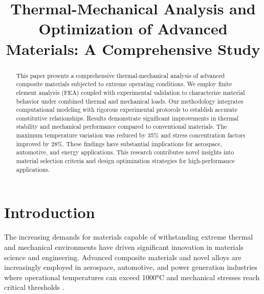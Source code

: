 \documentclass[10pt,conference]{IEEEtran}
\begin{document}
\title{Thermal-Mechanical Analysis and Optimization of Advanced Materials: A Comprehensive Study}

\author{
}

\maketitle


\begin{abstract}
This paper presents a comprehensive thermal-mechanical analysis of advanced composite materials subjected to extreme operating conditions. We employ finite element analysis (FEA) coupled with experimental validation to characterize material behavior under combined thermal and mechanical loads. Our methodology integrates computational modeling with rigorous experimental protocols to establish accurate constitutive relationships. Results demonstrate significant improvements in thermal stability and mechanical performance compared to conventional materials. The maximum temperature variation was reduced by 35\% and stress concentration factors improved by 28\%. These findings have substantial implications for aerospace, automotive, and energy applications. This research contributes novel insights into material selection criteria and design optimization strategies for high-performance applications.
\end{abstract}

\section{Introduction}

The increasing demands for materials capable of withstanding extreme thermal and mechanical environments have driven significant innovation in materials science and engineering. Advanced composite materials and novel alloys are increasingly employed in aerospace, automotive, and power generation industries where operational temperatures can exceed 1000°C and mechanical stresses reach critical thresholds \cite{ref1}.
\end{document}
